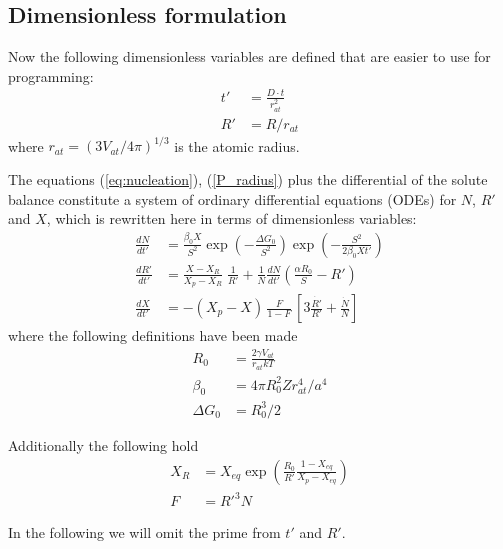 \documentclass[12pt,a4paper]{article}
\begin{document}
\subsection{Dimensionless formulation}
Now the following dimensionless variables are defined that are easier to use for programming:
\begin{subequations}
	\begin{align}
t' &= \frac{D\cdot t}{r_{at}^2} \\
R' &= R / r_{at}
	\end{align}
\end{subequations}
where $r_{at} = (3V_{at}/4\pi)^{1/3}$ is the atomic radius.

The equations (\ref{eq:nucleation}), (\ref{P_radius}) plus the differential of the solute balance constitute a system of ordinary differential equations (ODEs) for $N$, $R'$ and $X$, which is rewritten here in terms of dimensionless variables:
\begin{subequations}
\label{eq:ngode}
\begin{align}
\frac{dN}{dt'} &= 
\frac{\beta_0 X}{S^2} 
\exp\left( -\frac{\Delta G_0}{S^2}\right)  
\exp\left( -\frac{S^2}{2\beta_0 X t'}\right)  \\
\frac{dR'}{dt'} &=  
\frac{X - X_R}{X_p - X_R} 
\; \frac{1}{R'}
+ 
\frac{1}{N}\frac{dN}{dt'}
\left( \frac{\alpha R_0}{S} - R' \right) \\
\frac{dX}{dt'} &= -(X_p - X)\, \frac{F}{1-F} \,
\left[ 3\frac{\dot{R'}}{R'} + \frac{\dot{N}}{N} \right]
\end{align}
\end{subequations}
where the following definitions have been made
\begin{subequations}
\begin{align}
R_0 &= \frac{2\gamma V_{at}}{r_{at}kT} \\ 
\beta_0 &= 4\pi R_0^2 Z r_{at}^4/ a^4 \\
\Delta G_0 &= R_0^3/2  
\end{align}
\end{subequations}

Additionally the following hold
\begin{subequations}
\begin{align}
X_R &= X_{eq} \exp 
\left( \frac{R_0}{R'} \frac{1-X_{eq}}{X_p - X_{eq}}\right) \\
F &= R'^3 N
\end{align}
\end{subequations}

In the following we will omit the prime from $t'$ and $R'$.
\end{document}
